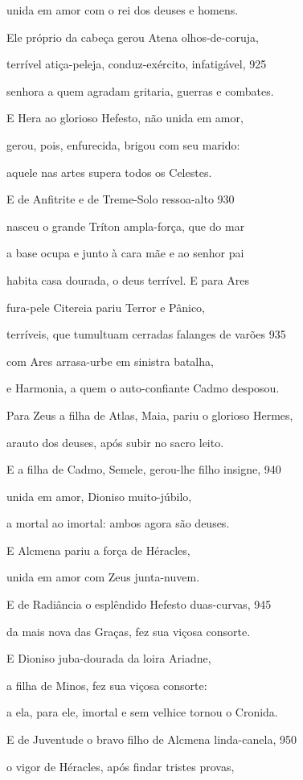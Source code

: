 unida em amor com o rei dos deuses e homens.

\quad{}Ele próprio da cabeça gerou Atena olhos-de-coruja,

terrível atiça-peleja, conduz-exército, infatigável, \num{925}

senhora a quem agradam gritaria, guerras e combates.

E Hera ao glorioso Hefesto, não unida em amor,

gerou, pois, enfurecida, brigou com seu marido:

aquele nas artes supera todos os Celestes.

\quad{}E de Anfitrite e de Treme-Solo ressoa-alto \num{930}

nasceu o grande Tríton ampla-força, que do mar

a base ocupa e junto à cara mãe e ao senhor pai

habita casa dourada, o deus terrível. E para Ares

fura-pele Citereia pariu Terror e Pânico,

terríveis, que tumultuam cerradas falanges de varões \num{935}

com Ares arrasa-urbe em sinistra batalha,

e Harmonia, a quem o auto-confiante Cadmo desposou.

\quad{}Para Zeus a filha de Atlas, Maia, pariu o glorioso Hermes,

arauto dos deuses, após subir no sacro leito.

\quad{}E a filha de Cadmo, Semele, gerou-lhe filho insigne, \num{940}

unida em amor, Dioniso muito-júbilo,

a mortal ao imortal: ambos agora são deuses.

\quad{}E Alcmena pariu a força de Héracles,

unida em amor com Zeus junta-nuvem.

\quad{}E de Radiância o esplêndido Hefesto duas-curvas, \num{945}

da mais nova das Graças, fez sua viçosa consorte.

\quad{}E Dioniso juba-dourada da loira Ariadne,

a filha de Minos, fez sua viçosa consorte:

a ela, para ele, imortal e sem velhice tornou o Cronida.

\quad{}E de Juventude o bravo filho de Alcmena linda-canela, \num{950}

o vigor de Héracles, após findar tristes provas,

